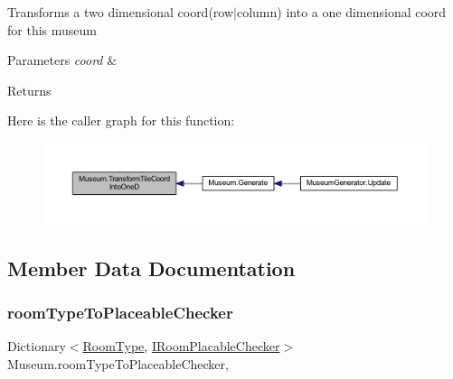 Transforms a two dimensional coord(row$\vert$column) into a one dimensional coord for this museum 


\begin{DoxyParams}{Parameters}
{\em coord} & \\
\hline
\end{DoxyParams}
\begin{DoxyReturn}{Returns}

\end{DoxyReturn}
Here is the caller graph for this function\+:
\nopagebreak
\begin{figure}[H]
\begin{center}
\leavevmode
\includegraphics[width=350pt]{class_museum_a405e60db962417dde46d46180cbf81df_icgraph}
\end{center}
\end{figure}


\subsection{Member Data Documentation}
\mbox{\label{class_museum_af3826f71fcb80bd1bf30f5fbf75b5e28}} 
\subsubsection{\texorpdfstring{room\+Type\+To\+Placeable\+Checker}{roomTypeToPlaceableChecker}}
{\footnotesize\ttfamily Dictionary$<$\mbox{\hyperlink{_room_8cs_ab540f7414f306325d92272bcef1e34e1}{Room\+Type}}, \mbox{\hyperlink{interface_i_room_placable_checker}{I\+Room\+Placable\+Checker}}$>$ Museum.\+room\+Type\+To\+Placeable\+Checker\hspace{0.3cm}{\ttfamily [static]}, {\ttfamily [private]}}

